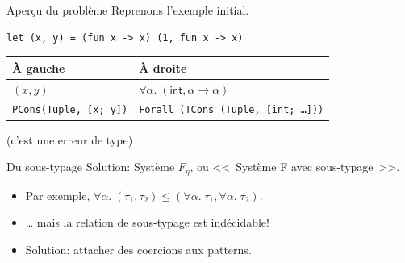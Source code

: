 \documentclass[final]{beamer}
\begin{document}
\begin{frame}[fragile]{Aperçu du problème}
Reprenons l'exemple initial.

\begin{verbatim}
let (x, y) = (fun x -> x) (1, fun x -> x)
\end{verbatim}

\begin{tabular}{l|l}
  À gauche & À droite\\
\hline
$(x, y)$ & $\forall \alpha.\; (\mathsf{int}, \alpha \to \alpha)$ \\
\texttt{PCons(Tuple, [x; y])} &
\texttt{Forall (TCons (Tuple, [int; …]))}
\end{tabular}

\vspace{2ex}


\begin{flushright}
  (c'est une erreur de type)
\end{flushright}

\end{frame}

\begin{frame}{Du sous-typage}
  Solution: Système $F_\eta$, ou <<~Système F avec sous-typage~>>.

  \begin{itemize}
    \item Par exemple, $\forall \alpha.\; (\tau_1, \tau_2) \leq (\forall
      \alpha.\; \tau_1, \forall \alpha.\; \tau_2)$.
      \pause
    \item … mais la relation de sous-typage est indécidable!
      \pause
    \item Solution: attacher des coercions aux patterns.
  \end{itemize}

  \begin{center}
  \end{center}
\end{frame}
\end{document}
